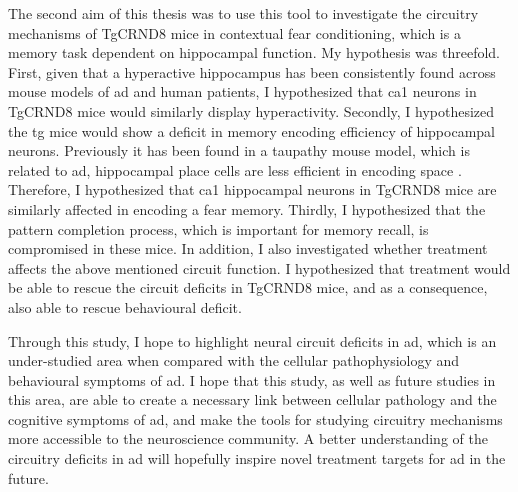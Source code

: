 The second aim of this thesis was to use this tool to investigate the circuitry mechanisms of TgCRND8 mice in contextual fear conditioning, which is a memory task dependent on hippocampal function. My hypothesis was threefold. First, given that a hyperactive hippocampus has been consistently found across mouse models of \gls{ad} and human patients, I hypothesized that \gls{ca1} neurons in TgCRND8 mice would similarly display hyperactivity. Secondly, I hypothesized the \gls{tg} mice would show a deficit in memory encoding efficiency of hippocampal neurons. Previously it has been found in a taupathy mouse model, which is related to \gls{ad}, hippocampal place cells are less efficient in encoding space \citep{cheng13, ciupek15}. Therefore, I hypothesized that \gls{ca1} hippocampal neurons in TgCRND8 mice are similarly affected in encoding a fear memory. Thirdly, I hypothesized that the pattern completion process, which is important for memory recall, is compromised in these mice. In addition, I also investigated whether \tglu{} treatment affects the above mentioned circuit function. I hypothesized that \tglu{} treatment would be able to rescue the circuit deficits in TgCRND8 mice, and as a consequence, also able to rescue behavioural deficit. 


Through this study, I hope to highlight neural circuit deficits in \gls{ad}, which is an under-studied area when compared with the cellular pathophysiology and behavioural symptoms of \gls{ad}. I hope that this study, as well as future studies in this area, are able to create a necessary link between cellular pathology and the cognitive symptoms of \gls{ad}, and make the tools for studying circuitry mechanisms more accessible to the neuroscience community. A better understanding of the circuitry deficits in \gls{ad} will hopefully inspire novel treatment targets for \gls{ad} in the future. 

